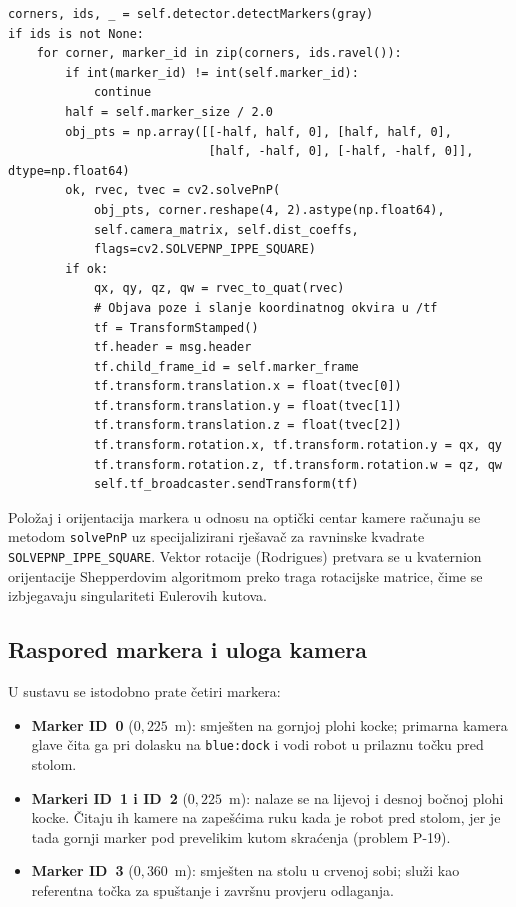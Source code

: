 \begin{lstlisting}[style=code-python, caption={Detekcija markera i rješavanje PnP problema (\texttt{aruco\_detector.py}, redci 114--154)}, label={lst:aruco}]
corners, ids, _ = self.detector.detectMarkers(gray)
if ids is not None:
    for corner, marker_id in zip(corners, ids.ravel()):
        if int(marker_id) != int(self.marker_id):
            continue
        half = self.marker_size / 2.0
        obj_pts = np.array([[-half, half, 0], [half, half, 0],
                            [half, -half, 0], [-half, -half, 0]], dtype=np.float64)
        ok, rvec, tvec = cv2.solvePnP(
            obj_pts, corner.reshape(4, 2).astype(np.float64),
            self.camera_matrix, self.dist_coeffs,
            flags=cv2.SOLVEPNP_IPPE_SQUARE)
        if ok:
            qx, qy, qz, qw = rvec_to_quat(rvec)
            # Objava poze i slanje koordinatnog okvira u /tf
            tf = TransformStamped()
            tf.header = msg.header
            tf.child_frame_id = self.marker_frame
            tf.transform.translation.x = float(tvec[0])
            tf.transform.translation.y = float(tvec[1])
            tf.transform.translation.z = float(tvec[2])
            tf.transform.rotation.x, tf.transform.rotation.y = qx, qy
            tf.transform.rotation.z, tf.transform.rotation.w = qz, qw
            self.tf_broadcaster.sendTransform(tf)
\end{lstlisting}

Položaj i orijentacija markera u odnosu na optički centar kamere računaju se metodom
\texttt{solvePnP} uz specijalizirani rješavač za ravninske kvadrate \texttt{SOLVEPNP\_IPPE\_SQUARE}.
Vektor rotacije (Rodrigues) pretvara se u kvaternion orijentacije Shepperdovim algoritmom preko traga
rotacijske matrice, čime se izbjegavaju singulariteti Eulerovih kutova.

\subsection{Raspored markera i uloga kamera}
\label{sec:05-kamere}

U sustavu se istodobno prate četiri markera:
\begin{itemize}
  \item \textbf{Marker ID~0} ($0{,}225$~m): smješten na gornjoj plohi kocke; primarna kamera glave čita ga pri dolasku na \texttt{blue:dock} i vodi robot u prilaznu točku pred stolom.
  \item \textbf{Markeri ID~1 i ID~2} ($0{,}225$~m): nalaze se na lijevoj i desnoj bočnoj plohi kocke. Čitaju ih kamere na zapešćima ruku kada je robot pred stolom, jer je tada gornji marker pod prevelikim kutom skraćenja (problem P-19).
  \item \textbf{Marker ID~3} ($0{,}360$~m): smješten na stolu u crvenoj sobi; služi kao referentna točka za spuštanje i završnu provjeru odlaganja.
\end{itemize}

